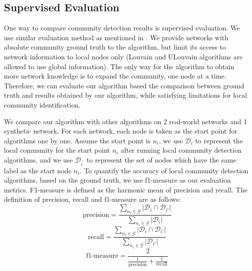 \documentclass[\main/thesis.tex]{subfiles}
\begin{document}
\subsection*{Supervised Evaluation}
One way to compare community detection results is supervised evaluation. We use similar evaluation method as mentioned in \cite{chen2009local}. We provide networks with absolute community ground truth to the algorithm, but limit its access to network information to local nodes only (Louvain and ULouvain algorithms are allowed to use global information). The only way for the algorithm to obtain more network knowledge is to expand the community, one node at a time. Therefore, we can evaluate our algorithm based the comparison between ground truth and results obtained by our algorithm, while satisfying limitations for local community identification.

We compare our algorithm with other algorithms on 2 real-world networks and 1 synthetic network. For each network, each node is taken as the start point for algorithms one by one. Assume the start point is $n_i$, we use $\mathcal{D}_{i}$ to represent the local community for the start point $n_i$ after running local community detection algorithms, and we use $\mathcal{D}_{i^\prime}$ to represent the set of nodes which have the same label as the start node $n_i$. To quantify the accuracy of local community detection algorithms, based on the ground truth, we use f1-measure as our evaluation metrics. F1-measure is defined as the harmonic mean of precision and recall. The definition of precision, recall and f1-measure are as follows:
\begin{equation}
\text{precision} = \frac{\sum_{n_i\in \mathcal{G}}|\mathcal{D}_{i} \cap \mathcal{D}_{i\prime}|}{\sum_{n_i\in \mathcal{G}}|\mathcal{D}_{i}|}
\end{equation}
\begin{equation}
\text{recall} = \frac{\sum_{n_i\in \mathcal{G}}|\mathcal{D}_{i} \cap \mathcal{D}_{i\prime}|}{\sum_{n_i\in \mathcal{G}}|\mathcal{D}_{i\prime}|}
\end{equation}
\begin{equation}
\text{f1-measure} = \frac{2}{\frac{1}{\text{precision}}+\frac{1}{\text{recall}}}
\end{equation}
\end{document}
